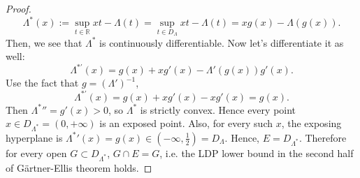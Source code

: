 \begin{proof}
	\[
		\Lambda^*(x) 
		:= \sup_{t \in \mathbb{R}} x t - \Lambda(t) 
		= \sup_{t \in D_\Lambda} x t - \Lambda(t) 
		= x g(x) - \Lambda(g(x))
	.\] 
	Then, we see that $\Lambda^*$ is continuously differentiable. Now let's differentiate it as well:
	\[
		\Lambda^{*\prime}(x) = g(x) + x g'(x) - \Lambda'(g(x))g'(x)
	.\] 
	Use the fact that $g = (\Lambda')^{-1}$,
	\[
		\Lambda^{*\prime}(x) = g(x) + x g'(x) - x g'(x) = g(x)
	.\] 
	Then ${\Lambda^*}'' = g'(x) > 0$, so $\Lambda^*$ is strictly convex. Hence every point $x \in D_{\Lambda^*} = (0, + \infty )$ is an exposed point. Also, for every such $x$, the exposing hyperplane is ${\Lambda^*}'(x) = g(x) \in (- \infty , \frac{1}{2}) = D_{\Lambda}$. Hence, $E = D_{\Lambda^*}$. Therefore for every open $G \subset D_{\Lambda^*}$,  $G \cap E = G$, i.e. the LDP lower bound in the second half of Gärtner-Ellis theorem holds.

	


\end{proof}

